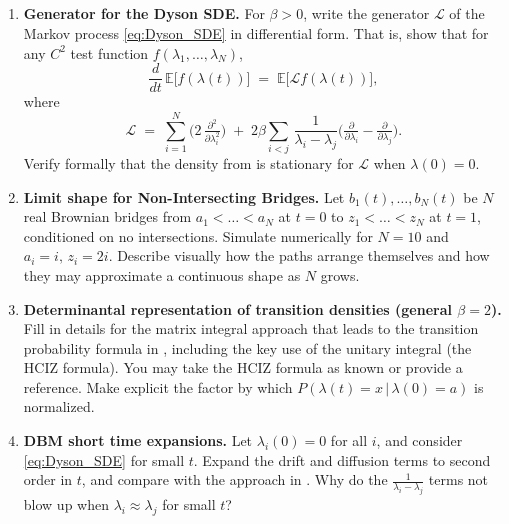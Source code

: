 \documentclass[letterpaper,11pt,oneside,reqno]{article}
\numberwithin{equation}{section}
\theoremstyle{definition}
\begin{document}
\subsection{}

\begin{enumerate}[1.]



\item \textbf{Generator for the Dyson SDE.} For $\beta>0$, write the generator $\mathcal{L}$ of the Markov process \eqref{eq:Dyson_SDE} in differential form. That is, show that for any $C^2$ test function $f(\lambda_1,\dots,\lambda_N)$,
\[
\frac{d}{dt}\,\mathbb{E}\bigl[f(\lambda(t))\bigr]
\;=\;\mathbb{E}\bigl[\mathcal{L}f(\lambda(t))\bigr],
\]
where
\[
\mathcal{L} \;=\; \sum_{i=1}^N \bigl(2\,\tfrac{\partial^2}{\partial \lambda_i^2}\bigr)
\;+\;2\beta\sum_{i<j}\,\frac{1}{\lambda_i-\lambda_j}\bigl(\tfrac{\partial}{\partial \lambda_i}-\tfrac{\partial}{\partial \lambda_j}\bigr).
\]
Verify formally that the density from  is stationary for $\mathcal{L}$ when $\lambda(0)=0$.



\item \textbf{Limit shape for Non-Intersecting Bridges.} Let $b_1(t),\dots,b_N(t)$ be $N$ real Brownian bridges from $a_1<\dots<a_N$ at $t=0$ to $z_1<\dots<z_N$ at $t=1$, conditioned on no intersections. Simulate numerically for $N=10$ and $a_i=i,\,z_i=2i$. Describe visually how the paths arrange themselves and how they may approximate a continuous shape as $N$ grows.

\item \textbf{Determinantal representation of transition densities (general $\beta=2$).} Fill in details for the matrix integral approach that leads to the transition probability formula in , including the key use of the unitary integral (the HCIZ formula). You may take the HCIZ formula as known or provide a reference. Make explicit the factor by which $P(\lambda(t)=x\,|\,\lambda(0)=a)$ is normalized.

\item \textbf{DBM short time expansions.} Let $\lambda_i(0)=0$ for all $i$, and consider \eqref{eq:Dyson_SDE} for small $t$. Expand the drift and diffusion terms to second order in $t$, and compare with the approach in . Why do the $\tfrac{1}{\lambda_i-\lambda_j}$ terms not blow up when $\lambda_i\approx \lambda_j$ for small $t$?
\end{enumerate}
\end{document}
